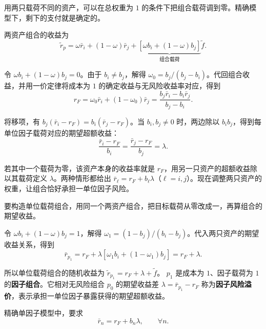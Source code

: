 用两只载荷不同的资产，可以在总权重为 $1$ 的条件下把组合载荷调到零。精确模型下，剩下的支付就是确定的。

\begin{solution}[label-content={证明（零载荷组合）},blank-type=none]
两资产组合的收益为
\[
 \widetilde r_p=\omega\bar r_i+(1-\omega)\bar r_j
 +\underbrace{[\omega b_i+(1-\omega)b_j]}_{\text{组合载荷}}\widetilde f.
\]

令 $\omega b_i+(1-\omega)b_j=0$。由于 $b_i\ne b_j$，解得 $\omega_0=b_j/(b_j-b_i)$。代回组合收益，并用一价定律将成本为 $1$ 的确定收益与无风险收益率对应，得到
\[
 r_F=\omega_0\bar r_i+(1-\omega_0)\bar r_j
 =\frac{b_j\bar r_i-b_i\bar r_j}{b_j-b_i}.
\]
\end{solution}

将移项，有 $b_j(\bar r_i-r_F)=b_i(\bar r_j-r_F)$。当 $b_i,b_j\ne0$ 时，两边除以 $b_i b_j$，得到每单位因子载荷对应的期望超额收益：
\begin{equation}
 \frac{\bar r_i-r_F}{b_i}=\frac{\bar r_j-r_F}{b_j}=\lambda.
 \label{eq:wj-14-4}
\end{equation}

若其中一个载荷为零，该资产本身的收益率就是 $r_F$，用另一只资产的超额收益除以其载荷定义 $\lambda$。两种情形都给出 $\bar r_\ell=r_F+b_\ell\lambda$（$\ell=i,j$）。现在调整两只资产的权重，让组合恰好承担一单位因子风险。

要构造单位载荷组合，用同一个两资产组合，把目标载荷从零改成一，再算组合的期望收益。

\begin{solution}[label-content={证明（单位载荷组合）},blank-type=none]
令 $\omega b_i+(1-\omega)b_j=1$，解得 $\omega_1=(1-b_j)/(b_i-b_j)$。代入两只资产的期望收益关系，得到
\[
 \bar r_{p_1}=r_F+\lambda[\omega_1b_i+(1-\omega_1)b_j]=r_F+\lambda.
\]
\end{solution}

所以单位载荷组合的随机收益为 $\widetilde r_{p_1}=r_F+\lambda+\widetilde f$。
$p_1$ 是成本为 $1$、因子载荷为 $1$ 的\textbf{因子组合}。它相对无风险组合 $p_0$ 的期望收益差 $\lambda=\bar r_{p_1}-r_F$ 称为\textbf{因子风险溢价}，表示承担一单位因子暴露获得的期望超额收益。

\begin{tcolorbox}[knowledge]
 精确单因子模型中，要求
\begin{equation}
 \bar r_n=r_F+b_n\lambda,\qquad\forall n.\label{eq:wj-14-5}
\end{equation}
\end{tcolorbox}

